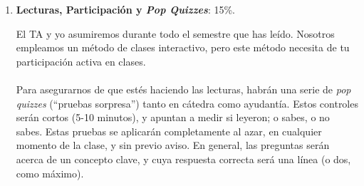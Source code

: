 \documentclass[letterpaper]{article}
\begin{document}
\begin{enumerate}

	\item {\bf Lecturas, Participaci\'on y \emph{Pop Quizzes}}: 15\%.
	
    El TA y yo asumiremos durante todo el semestre que has le\'ido. Nosotros empleamos un m\'etodo de clases interactivo, pero este m\'etodo necesita de tu participaci\'on activa en clases.
    \\
    \\  
    Para asegurarnos de que est\'es haciendo las lecturas, habr\'an una serie de \emph{pop quizzes} (``pruebas sorpresa'') tanto en c\'atedra como ayudant\'ia. Estos controles ser\'an cortos (5-10 minutos), y apuntan a medir si leyeron; o sabes, o no sabes. Estas pruebas se aplicar\'an completamente al azar, en cualquier momento de la clase, y sin previo aviso. En general, las preguntas ser\'an acerca de un concepto clave, y cuya respuesta correcta ser\'a una l\'inea (o dos, como m\'aximo).



\end{enumerate}
\end{document}
